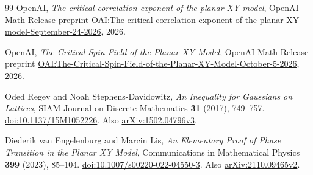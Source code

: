 \begin{thebibliography}{99}
OpenAI,
\emph{The critical correlation exponent of the planar XY model},
OpenAI Math Release preprint
\href{https://github.com/openai/math/blob/main/preprints/The-critical-correlation-exponent-of-the-planar-XY-model-September-24-2026/paper.pdf}{OAI:The-critical-correlation-exponent-of-the-planar-XY-model-September-24-2026},
2026.

OpenAI,
\emph{The Critical Spin Field of the Planar XY Model},
OpenAI Math Release preprint
\href{https://github.com/openai/math/blob/main/preprints/The-Critical-Spin-Field-of-the-Planar-XY-Model-October-5-2026/paper.pdf}{OAI:The-Critical-Spin-Field-of-the-Planar-XY-Model-October-5-2026},
2026.

Oded Regev and Noah Stephens-Davidowitz,
\emph{An Inequality for Gaussians on Lattices},
SIAM Journal on Discrete Mathematics \textbf{31} (2017), 749--757.
\href{https://doi.org/10.1137/15M1052226}{doi:10.1137/15M1052226}.
Also \href{https://arxiv.org/abs/1502.04796v3}{arXiv:1502.04796v3}.

Diederik van Engelenburg and Marcin Lis,
\emph{An Elementary Proof of Phase Transition in the Planar XY Model},
Communications in Mathematical Physics \textbf{399} (2023), 85--104.
\href{https://doi.org/10.1007/s00220-022-04550-3}{doi:10.1007/s00220-022-04550-3}.
Also \href{https://arxiv.org/abs/2110.09465v2}{arXiv:2110.09465v2}.

\end{thebibliography}
